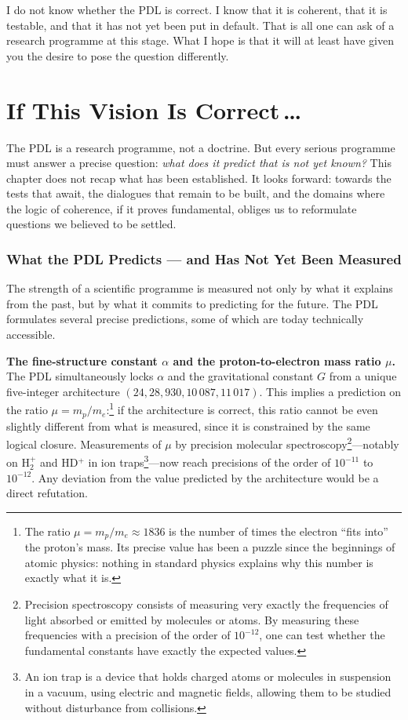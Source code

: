 \documentclass[12pt, a4paper, openright]{book}
\begin{document}
\medskip

I do not know whether the PDL is correct. I know that it is coherent, that it is testable, and that it has not yet been put in default. That is all one can ask of a research programme at this stage. What I hope is that it will at least have given you the desire to pose the question differently.

\chapter{If This Vision Is Correct\texorpdfstring{\,\ldots}{...}}

The PDL is a research programme, not a doctrine. But every serious programme must answer a precise question: \emph{what does it predict that is not yet known?} This chapter does not recap what has been established. It looks forward: towards the tests that await, the dialogues that remain to be built, and the domains where the logic of coherence, if it proves fundamental, obliges us to reformulate questions we believed to be settled.

\subsection*{What the PDL Predicts --- and Has Not Yet Been Measured}

The strength of a scientific programme is measured not only by what it explains from the past, but by what it commits to predicting for the future. The PDL formulates several precise predictions, some of which are today technically accessible.

\medskip

\textbf{The fine-structure constant $\alpha$ and the proton-to-electron mass ratio $\mu$.} The PDL simultaneously locks $\alpha$ and the gravitational constant $G$ from a unique five-integer architecture $(24, 28, 930, 10\,087, 11\,017)$. This implies a prediction on the ratio $\mu = m_p / m_e$:\footnote{The ratio $\mu = m_p/m_e \approx 1836$ is the number of times the electron ``fits into'' the proton's mass. Its precise value has been a puzzle since the beginnings of atomic physics: nothing in standard physics explains why this number is exactly what it is.} if the architecture is correct, this ratio cannot be even slightly different from what is measured, since it is constrained by the same logical closure. Measurements of $\mu$ by precision molecular spectroscopy\footnote{Precision spectroscopy consists of measuring very exactly the frequencies of light absorbed or emitted by molecules or atoms. By measuring these frequencies with a precision of the order of $10^{-12}$, one can test whether the fundamental constants have exactly the expected values.}---notably on H$_2^+$ and HD$^+$ in ion traps\footnote{An ion trap is a device that holds charged atoms or molecules in suspension in a vacuum, using electric and magnetic fields, allowing them to be studied without disturbance from collisions.}---now reach precisions of the order of $10^{-11}$ to $10^{-12}$. Any deviation from the value predicted by the architecture would be a direct refutation.
\end{document}
